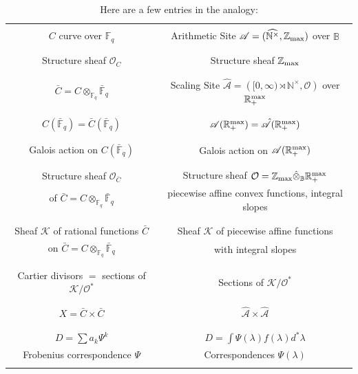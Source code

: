 \documentclass[12pt]{article}
\def\B{{\mathbb B}}
\def\F{{\mathbb F}}
\def\N{{\mathbb N}}
\def\R{{\mathbb R}}
\def\Z{{\mathbb Z}}
\def\aarith{{\mathscr A}}
\def\scal{{(\rnt,\cO)}}
\def\scal1{{\hat \aarith}}
\def\cK{{\mathcal K}}
\def\cO{{\mathcal O}}
\def\zmax{{\Z_{\rm max}}}
\def\rmax{\R_+^{\rm max}}
\def\vsp{\vspace{.05in}}
\def\wnt{{\widehat{\N^{\times}}}}
\def\rnt{{[0,\infty)\rtimes{\N^{\times}}}}
\begin{document}
\begin{table}[H]
\begin{center}
\caption{Here are a few entries in the analogy:}
\label{tab:1}       %
\vsp\vsp
\begin{tabular}{| c | c |}%
\hline
&\\
$C$ curve over $\F_q$ & Arithmetic Site $\aarith= ( \wnt,\zmax)$ over $\B$ \\ &\\
\hline &\\
Structure sheaf $\cO_{C}$& Structure sheaf $\zmax$  \\
&\\
\hline &\\
$\bar C=C\otimes_{\F_q} \bar\F_q$& Scaling Site $\scal1=(\rnt,\cO)$ over $\rmax$\\ 
&\\
\hline &\\
$C( \bar\F_q)=\bar C(\bar\F_q)$& $\aarith(\rmax)=\scal1(\rmax)$\\ &\\
\hline &\\
Galois action on $C( \bar\F_q)$& Galois action on $\aarith(\rmax)$ \\ &\\
\hline &\\
Structure sheaf $\cO_{\bar C}$& Structure sheaf $\cO=\zmax\hat\otimes_\B\rmax$\\
of $\bar C=C\otimes_{\F_q} \bar\F_q$ & piecewise affine convex functions, integral slopes\\ &\\
\hline&\\
Sheaf $\cK$ of rational functions  $\bar C$ & Sheaf $\cK$ of  piecewise affine functions\\ 
on $\bar C=C\otimes_{\F_q} \bar\F_q$& with integral slopes\\& \\
\hline&\\
Cartier divisors $=$ sections of $\cK/\cO^*$ & Sections of  $\cK/\cO^*$\\
&\\
\hline &\\
$X= \bar C\times \bar C$ & $\scal1\times \scal1$\\ &\\
\hline &\\
$D=\sum a_k\Psi^k$ &  $D=\int \Psi(\lambda) f(\lambda) d^*\lambda$ \\ 
Frobenius correspondence $\Psi$& Correspondences $\Psi(\lambda)$\\ &\\
\hline
\end{tabular}
\end{center}
\end{table}
\end{document}
